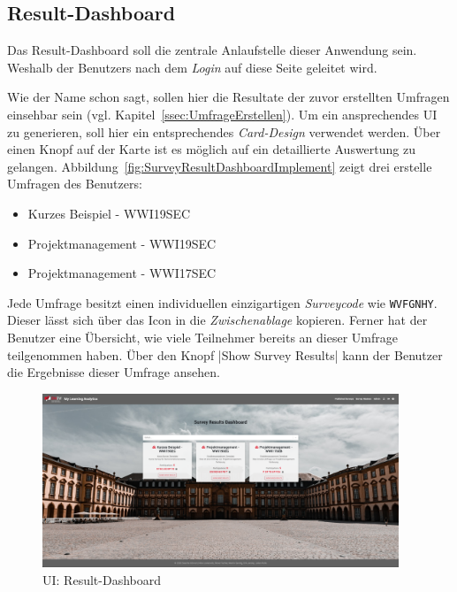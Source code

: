 
\subsection{Result-Dashboard}
\label{ssec:ResultDashboardImplement}

Das Result-Dashboard soll die zentrale Anlaufstelle dieser Anwendung sein.
Weshalb der Benutzers nach dem \emph{Login} auf diese Seite geleitet wird.

Wie der Name schon sagt, sollen hier die Resultate der zuvor erstellten Umfragen einsehbar sein (vgl. Kapitel~\vref{ssec:UmfrageErstellen}).
Um ein ansprechendes \ac{UI} zu generieren, soll hier ein entsprechendes \emph{Card-Design} verwendet werden.
Über einen Knopf auf der Karte ist es möglich auf ein detaillierte Auswertung zu gelangen. \newline
Abbildung~\vref{fig:SurveyResultDashboardImplement} zeigt drei erstelle Umfragen des Benutzers:
% 
\begin{itemize}
	\item Kurzes Beispiel - WWI19SEC
	\item Projektmanagement - WWI19SEC
	\item Projektmanagement - WWI17SEC
\end{itemize}
% 
Jede Umfrage besitzt einen individuellen einzigartigen \emph{Surveycode} wie \zb \texttt{W\-V\-F\-G\-N\-H\-Y}.
Dieser lässt sich über das Icon \faClipboard\xspace in die \emph{Zwischenablage} kopieren.
Ferner hat der Benutzer eine Übersicht, wie viele Teilnehmer  bereits an dieser Umfrage teilgenommen haben.
Über den Knopf \jinline|Show Survey Results| kann der Benutzer die Ergebnisse dieser Umfrage ansehen.

\begin{figure}[!htb]
	\centering
	\includegraphics[width=0.95\textwidth, keepaspectratio]{img/client/SurveyResultDashboard.png}
	\captionsetup{justification=centering, format=plain}
	\caption[\acl{UI}: Result-Dashboard]{\acl{UI}: Result-Dashboard \\ \quelleScreenshot}
	\label{fig:SurveyResultDashboardImplement}
\end{figure}

